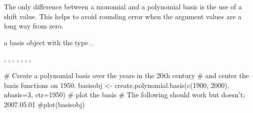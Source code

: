 \begin{Details}\relax
The only difference between a monomial and a polynomial basis
is the use of a shift value.  This helps to avoid rounding error
when the argument values are a long way from zero.
\end{Details}
\begin{Value}
a basis object with the type .
\end{Value}
\begin{SeeAlso}\relax
{}, 
, 
, 
, 
, 
, 
, 
\end{SeeAlso}
\begin{Examples}
\begin{ExampleCode}
#  Create a polynomial basis over the years in the 20th century
#  and center the basis functions on 1950.
basisobj <- create.polynomial.basis(c(1900, 2000), nbasis=3, ctr=1950)
#  plot the basis
# The following should work but doesn't;  2007.05.01
#plot(basisobj)
\end{ExampleCode}
\end{Examples}

